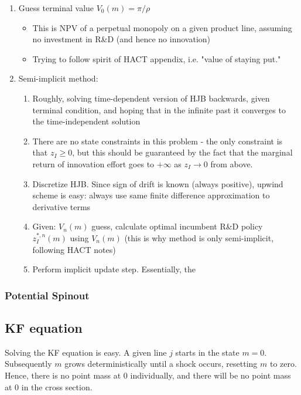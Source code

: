 \documentclass[12pt,english]{article}
\theoremstyle{remark}
\begin{document}
\begin{enumerate}
	\item Guess terminal value $V_0(m) = \pi / \rho$
	\begin{itemize}
		\item This is NPV of a perpetual monopoly on a given product line, assuming no investment in R\&D (and hence no innovation)
		\item Trying to follow spirit of HACT appendix, i.e. "value of staying put."
	\end{itemize}
	\item Semi-implicit method:
	\begin{enumerate}
		\item Roughly, solving time-dependent version of HJB backwards, given terminal condition, and hoping that in the infinite past it converges to the time-independent solution
		\item There are no state constraints in this problem - the only constraint is that $z_I \ge 0$, but this should be guaranteed by the fact that the marginal return of innovation effort goes to $+\infty$ as $z_I \to 0$ from above. 
		\item Discretize HJB. Since sign of drift is known (always positive), upwind scheme is easy: always use same finite difference approximation to derivative terms
		\item Given: $V_n(m)$ guess, calculate optimal incumbent R\&D policy $z_I^{*,n}(m)$ using $V_n(m)$ (this is why method is only semi-implicit, following HACT notes)
		\item Perform implicit update step. Essentially, the 
	\end{enumerate}
\end{enumerate}

\subsubsection{Potential Spinout}

\subsection{KF equation}

Solving the KF equation is easy. A given line $j$ starts in the state $m = 0$. Subsequently $m$ grows deterministically until a shock occurs, resetting $m$ to zero. Hence, there is no point mass at 0 individually, and there will be no point mass at 0 in the cross section. 
\end{document}
